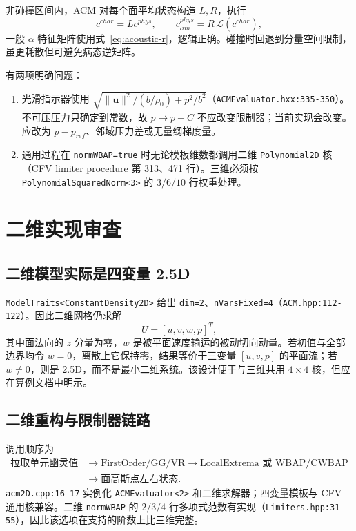 \documentclass[UTF8,11pt,a4paper]{ctexart}
\newcommand{\code}[1]{\nolinkurl{#1}}
\begin{document}
非碰撞区间内，ACM 对每个面平均状态构造 $L,R$，执行
\begin{equation}
 c^{char}=L c^{phys},\qquad
 c^{phys}_{lim}=R\,\mathcal L(c^{char}),
\end{equation}
一般 $\alpha$ 特征矩阵使用式~\eqref{eq:acoustic-r}，逻辑正确。碰撞时回退到分量空间限制，虽更耗散但可避免病态逆矩阵。

有两项明确问题：

\begin{enumerate}
  \item 光滑指示器使用 $\sqrt{\|\bm u\|^2/(b/\rho_0)+p^2/b^2}$（\code{ACMEvaluator.hxx:335-350}）。不可压压力只确定到常数，故 $p\mapsto p+C$ 不应改变限制器；当前实现会改变。应改为 $p-p_{ref}$、邻域压力差或无量纲梯度量。
  \item 通用过程在 \code{normWBAP=true} 时无论模板维数都调用二维 \code{Polynomial2D} 核（CFV limiter procedure 第 313、471 行）。三维必须按 \code{PolynomialSquaredNorm<3>} 的 $3/6/10$ 行权重处理。
\end{enumerate}

\section{二维实现审查}

\subsection{二维模型实际是四变量 2.5D}

\code{ModelTraits<ConstantDensity2D>} 给出 \code{dim=2}、\code{nVarsFixed=4}（\code{ACM.hpp:112-122}）。因此二维网格仍求解
\begin{equation}
 U=[u,v,w,p]^T,
\end{equation}
其中面法向的 $z$ 分量为零，$w$ 是被平面速度输运的被动切向动量。若初值与全部边界均令 $w=0$，离散上它保持零，结果等价于三变量 $[u,v,p]$ 的平面流；若 $w\neq0$，则是 2.5D，而不是最小二维系统。该设计便于与三维共用 $4\times4$ 核，但应在算例文档中明示。

\subsection{二维重构与限制器链路}

调用顺序为
\begin{align*}
 \text{拉取单元幽灵值}&\rightarrow \text{FirstOrder/GG/VR}
 \rightarrow \text{LocalExtrema 或 WBAP/CWBAP}\\
 &\rightarrow \text{面高斯点左右状态}.
\end{align*}
\code{acm2D.cpp:16-17} 实例化 \code{ACMEvaluator<2>} 和二维求解器；四变量模板与 CFV 通用核兼容。二维 \code{normWBAP} 的 $2/3/4$ 行多项式范数有实现（\code{Limiters.hpp:31-55}），因此该选项在支持的阶数上比三维完整。
\end{document}
